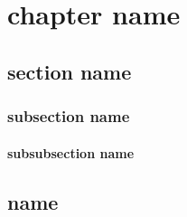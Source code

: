 \documentclass[UTF8]{ctexbook}
\begin{document}
\chapter{chapter name}
  \label{chap:chapter_name}
\newpage

\section{section name}
  \label{sec:section_name}
  \subsection{subsection name}
    \label{subsec:subsection_name}
    \subsubsection{subsubsection name}
      \label{subsubsec:subsubsection_name}


      \section{ name}
          \label{sec:section_name}
\end{document}
